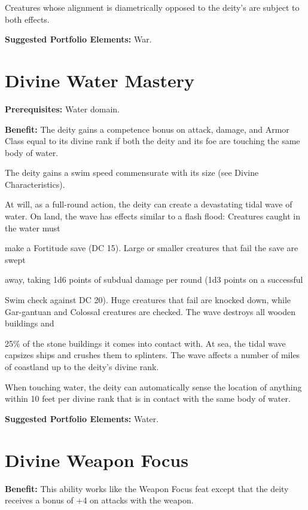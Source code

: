 \documentclass{article}
\begin{document}
Creatures whose alignment is diametrically opposed to the deity's are subject to 
both effects.

\textbf{Suggested Portfolio Elements:} War.

\vspace{12pt}
\section*{Divine Water Mastery}

\textbf{Prerequisites:} Water domain.

\textbf{Benefit:} The deity gains a competence bonus on attack, damage, and Armor 
Class equal to its divine rank if both the deity and its foe are touching the same 
body of water.

The deity gains a swim speed commensurate with its size (see Divine Characteristics).

At will, as a full-round action, the deity can create a devastating tidal wave 
of water. On land, the wave has effects similar to a flash flood: Creatures caught 
in the water must

make a Fortitude save (DC 15). Large or smaller creatures that fail the save are 
swept

away, taking 1d6 points of subdual damage per round (1d3 points on a successful

Swim check against DC 20). Huge creatures that fail are knocked down, while Gar-gantuan 
and Colossal creatures are checked. The wave destroys all wooden buildings and

25\% of the stone buildings it comes into contact with. At sea, the tidal wave 
capsizes ships and crushes them to splinters. The wave affects a number of miles 
of coastland up to the deity's divine rank. 

When touching water, the deity can automatically sense the location of anything 
within 10 feet per divine rank that is in contact with the same body of water.

\textbf{Suggested Portfolio Elements:} Water.

\vspace{12pt}
\section*{Divine Weapon Focus}

\textbf{Benefit:} This ability works like the Weapon Focus feat except that the 
deity receives a bonus of +4 on attacks with the weapon. 
\end{document}
